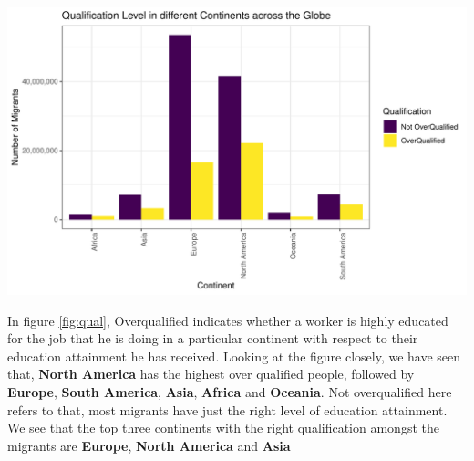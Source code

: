 \documentclass[11pt,a4paper,]{article}
\let\origfigure\figure
\let\endorigfigure\endfigure
\renewenvironment{figure}[1][2] {
    \expandafter\origfigure\expandafter[H]
} {
    \endorigfigure
}%
\begin{document}
\begin{figure}
\centering
\includegraphics{ETC5513assignment4_files/figure-latex/qual-1.pdf}
\caption{\label{fig:qual}Occupation Types}
\end{figure}

In figure \ref{fig:qual}, Overqualified indicates whether a worker is highly educated for the job that he is doing in a particular continent with respect to their education attainment he has received. Looking at the figure closely, we have seen that, \textbf{North America} has the highest over qualified people, followed by \textbf{Europe}, \textbf{South America}, \textbf{Asia}, \textbf{Africa} and \textbf{Oceania}. Not overqualified here refers to that, most migrants have just the right level of education attainment. We see that the top three continents with the right qualification amongst the migrants are \textbf{Europe}, \textbf{North America} and \textbf{Asia}
\end{document}
